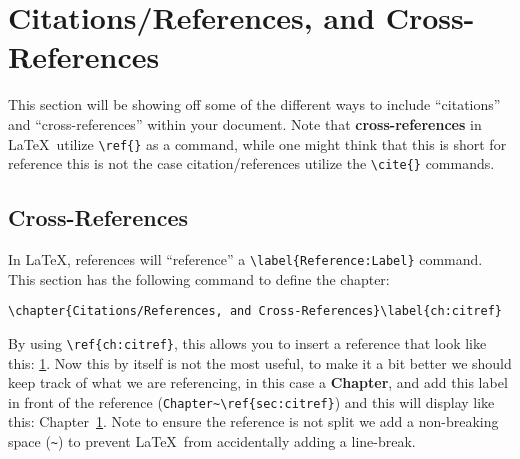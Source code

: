 \chapter{Citations/References, and Cross-References}\label{ch:citref}
	This section will be showing off some of the different ways to include \enquote{citations} and \enquote{cross-references} within your document.
	Note that \textbf{cross-references} in \LaTeX\ utilize \lstinline|\ref{}| as a command, while one might think that this is short for reference this is not the case citation/references utilize the \lstinline|\cite{}| commands.
	\section{Cross-References}
		In \LaTeX, references will \enquote{reference} a \lstinline|\label{Reference:Label}| command. 
		This section has the following command to define the chapter:
		\begin{Center}
			\lstinline|\chapter{Citations/References, and Cross-References}\label{ch:citref}|
		\end{Center}
		By using \lstinline|\ref{ch:citref}|, this allows you to insert a reference that look like this: \ref{ch:citref}.
		Now this by itself is not the most useful, to make it a bit better we should keep track of what we are referencing, in this case a \textbf{Chapter}, and add this label in front of the reference (\lstinline|Chapter~\ref{sec:citref}|) and this will display like this: Chapter~\ref{ch:citref}.
		Note to ensure the reference is not split we add a non-breaking space (\lstinline|~|) to prevent \LaTeX\ from accidentally adding a line-break.

